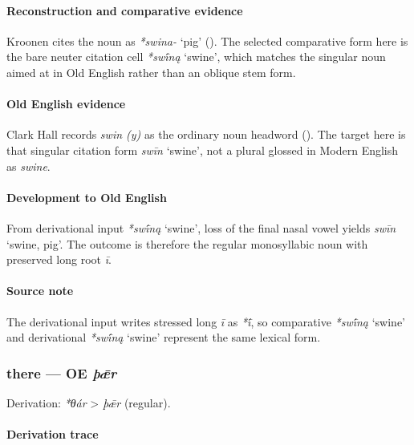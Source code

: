 \documentclass[
  british,
  a4paper,
]{article}
\providecommand{\Recon}[1]{\emph{*#1}}
\begin{document}
\paragraph{Reconstruction and comparative
evidence}\label{reconstruction-and-comparative-evidence-62}

Kroonen cites the noun as \emph{*swina-} `pig'
(). The selected comparative
form here is the bare neuter citation cell \Recon{swī́ną} `swine', which
matches the singular noun aimed at in Old English rather than an oblique
stem form.

\paragraph{Old English evidence}\label{old-english-evidence-64}

Clark Hall records \emph{swin (y)} as the ordinary noun headword
(). The target here is that
singular citation form \emph{swīn} `swine', not a plural glossed in
Modern English as \emph{swine}.

\paragraph{Development to Old
English}\label{development-to-old-english-63}

From derivational input \Recon{swī́ną} `swine', loss of the final nasal
vowel yields {\emph{swīn}} `swine, pig'. The outcome is therefore the
regular monosyllabic noun with preserved long root \emph{ī}.

\paragraph{Source note}\label{source-note-4}

The derivational input writes stressed long \emph{ī} as \emph{*ī́}, so
comparative \Recon{swī́ną} `swine' and derivational \Recon{swī́ną} `swine'
represent the same lexical form.

\subsubsection{\texorpdfstring{there --- OE
\emph{þǣr}}{there --- OE þǣr}}\label{there-oe-uxfeux1e3r}

Derivation: \emph{*θár} \textgreater{} \emph{þǣr} (regular).

\paragraph{Derivation trace}\label{derivation-trace-82}
\end{document}
